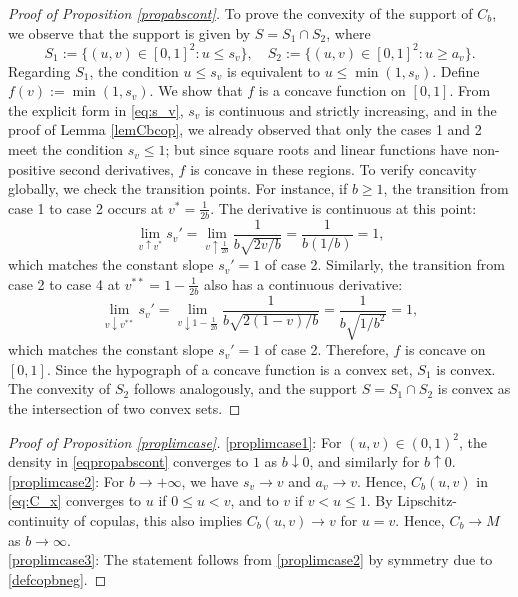 \documentclass{article}
\theoremstyle{plain}
\theoremstyle{definition}
\begin{document}
\begin{proof}[Proof of Proposition \ref{propabscont}]
    To prove the convexity of the support of \(C_b\), we observe that the support is given by $S = S_1 \cap S_2$, where
    \[
        S_1 := \{(u,v) \in [0,1]^2 : u \le s_v\},
        \quad S_2 := \{(u,v) \in [0,1]^2 : u \ge a_v\}.
    \]
    Regarding $S_1$, the condition \(u \le s_v\) is equivalent to \(u \le \min(1, s_v)\).
    Define \(f(v) := \min(1, s_v)\). We show that \(f\) is a concave function on \([0,1]\).
    From the explicit form in \eqref{eq:s_v}, \(s_v\) is continuous and strictly increasing, and in the proof of Lemma \ref{lemCbcop}, we already observed that only the cases 1 and 2 meet the condition \(s_v \le 1\); but since square roots and linear functions have non-positive second derivatives, \(f\) is concave in these regions.
    To verify concavity globally, we check the transition points. For instance, if \(b \ge 1\), the transition from case 1 to case 2 occurs at \(v^* = \frac{1}{2b}\). The derivative is continuous at this point:
    \[
        \lim_{v \uparrow v^*} s_v' = \lim_{v \uparrow \frac{1}{2b}} \frac{1}{b\sqrt{2v/b}} = \frac{1}{b(1/b)} = 1,
    \]
    which matches the constant slope \(s_v'=1\) of case 2.
    Similarly, the transition from case 2 to case 4 at \(v^{**} = 1 - \frac{1}{2b}\) also has a continuous derivative:
    \[
        \lim_{v \downarrow v^{**}} s_v'
        = \lim_{v \downarrow 1 - \frac{1}{2b}} \frac{1}{b\sqrt{2(1-v)/b}}
        = \frac{1}{b\sqrt{1/b^2}}
        = 1,
    \]
    which matches the constant slope \(s_v'=1\) of case 2.
    Therefore, \(f\) is concave on \([0,1]\).
    Since the hypograph of a concave function is a convex set, \(S_1\) is convex.
    The convexity of \(S_2\) follows analogously, and the support \(S = S_1 \cap S_2\) is convex as the intersection of two convex sets.
\end{proof}

\begin{proof}[Proof of Proposition \ref{proplimcase}]
\ref{proplimcase1}: For \((u,v)\in (0,1)^2\), the density in \eqref{eqpropabscont} converges to \(1\) as \(b\downarrow 0\), and similarly for \(b\uparrow 0\). \\
    \ref{proplimcase2}: For \(b\to +\infty\), we have \(s_v\to v\) and \(a_v \to v\). Hence, \(C_b(u,v)\) in \eqref{eq:C_x} converges to \(u\) if \(0\leq u < v\), and to \(v\) if \(v < u \leq 1\). By Lipschitz-continuity of copulas, this also implies \(C_b(u,v) \to v\) for \(u=v\). Hence, \(C_b \to M\) as \(b\to \infty\).\\
    \ref{proplimcase3}: The statement follows from \ref{proplimcase2} by symmetry due to \eqref{defcopbneg}.
\end{proof}
\end{document}
